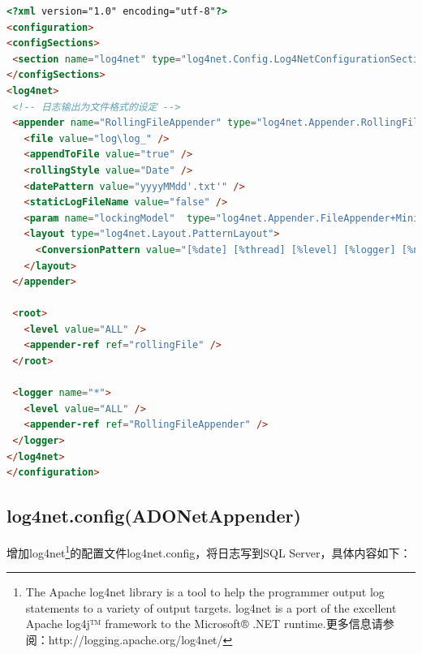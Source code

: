 \documentclass{book}
\begin{document}
\begin{lstlisting}[language=HTML]
<?xml version="1.0" encoding="utf-8"?>
<configuration>
<configSections>
 <section name="log4net" type="log4net.Config.Log4NetConfigurationSectionHandler, log4net"/>
</configSections>
<log4net>
 <!-- 日志输出为文件格式的设定 -->
 <appender name="RollingFileAppender" type="log4net.Appender.RollingFileAppender">
   <file value="log\log_" />
   <appendToFile value="true" />
   <rollingStyle value="Date" />
   <datePattern value="yyyyMMdd'.txt'" />
   <staticLogFileName value="false" />
   <param name="lockingModel"  type="log4net.Appender.FileAppender+MinimalLock" />
   <layout type="log4net.Layout.PatternLayout">
     <ConversionPattern value="[%date] [%thread] [%level] [%logger] [%ndc] - %message%newline" />
   </layout>
 </appender>
 
 <root>
   <level value="ALL" />
   <appender-ref ref="rollingFile" />
 </root>

 <logger name="*">
   <level value="ALL" />
   <appender-ref ref="RollingFileAppender" />
 </logger>
</log4net>
</configuration>	
\end{lstlisting}

\subsection{log4net.config(ADONetAppender)}

增加log4net\footnote{The Apache log4net library is a tool to help the programmer output log statements to a variety of output targets. log4net is a port of the excellent Apache log4j™ framework to the Microsoft® .NET runtime.更多信息请参阅：http://logging.apache.org/log4net/}的配置文件log4net.config，将日志写到SQL Server，具体内容如下：
\end{document}
